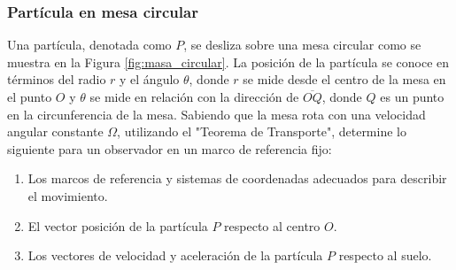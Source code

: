 \subsubsection{Partícula en mesa circular}
Una partícula, denotada como $P$, se desliza sobre una mesa circular como se muestra en la Figura \ref{fig:masa_circular}. La posición de la partícula se conoce en términos del radio $r$ y el ángulo $\theta$, donde $r$ se mide desde el centro de la mesa en el punto $O$ y $\theta$ se mide en relación con la dirección de $\overline{OQ}$, donde $Q$ es un punto en la circunferencia de la mesa. Sabiendo que la mesa rota con una velocidad angular constante $\Omega$, utilizando el "Teorema de Transporte", determine lo siguiente para un observador en un marco de referencia fijo:

\begin{enumerate}
    \item Los marcos de referencia y sistemas de coordenadas adecuados para describir el movimiento.
    \item El vector posición de la partícula $P$ respecto al centro $O$.
    \item Los vectores de velocidad y aceleración de la partícula $P$ respecto al suelo.
\end{enumerate}

